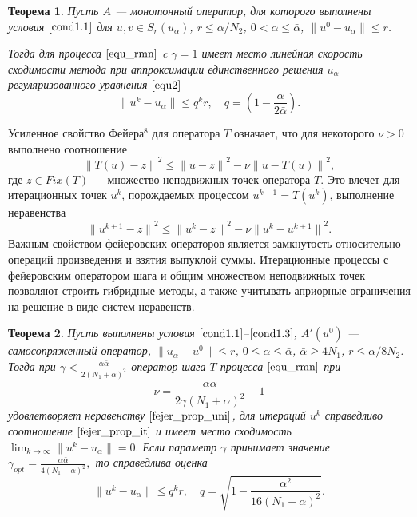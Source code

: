 \documentclass[%
autoref,     %
href,        %
facsimile,   %
colorlinks,  %
]{disser}
\newtheorem{theorem}{Теорема}
\begin{document}
\begin{theorem}\label{teo2.1} Пусть $A$ --- монотонный оператор, для которого выполнены условия $\eqref{cond1.1}$ для $u, v \in S_r(u_\alpha)$, $r\leqslant \alpha/N_2$, $0<\alpha \leqslant \bar\alpha$, $\|u^0-u_\alpha\| \leqslant r$. 
	
	Тогда для процесса $\eqref{equ_rmn}$ c $\gamma=1$ имеет место линейная скорость сходимости метода при аппроксимации единственного решения $u_\alpha$ регуляризованного уравнения $\eqref{equ2}$
	\begin{equation}\label{nwt_conv}
	\| u^k-u_\alpha \| \leqslant q^kr, \quad q=(1-\frac{\alpha}{2\bar\alpha}).
	\end{equation}
\end{theorem}

Усиленное свойство Фейера$^8$ для оператора $T$ означает, что для некоторого $\nu>0$ выполнено соотношение
\begin{equation}\label{fejer_prop_uni}
{\|T(u)-z\|}^2\leqslant{\|u-z\|}^2-\nu{\|u-T(u)\|}^2,
\end{equation}
где $z\in Fix(T)$ --- множество неподвижных точек оператора $T$. Это влечет для итерационных точек $u^k$, порождаемых процессом $u^{k+1}=T(u^k)$, выполнение неравенства
\begin{equation}\label{fejer_prop_it}
{\|u^{k+1}-z\|}^2\leqslant{\|u^k-z\|}^2-\nu{\|u^k-u^{k+1}\|}^2.
\end{equation}
{\scriptsize
\let\thefootnote\relax\let\thefootnote\relax{}}
Важным свойством фейеровских операторов является замкнутость относительно операций произведения и взятия выпуклой суммы. Итерационные процессы с фейеровским оператором шага и общим множеством неподвижных точек позволяют строить гибридные методы, а также учитывать априорные ограничения на решение в виде систем неравенств.

\begin{theorem} \label{teo2.3}
	Пусть выполнены условия $\eqref{cond1.1}$--$\eqref{cond1.3}$, $A'(u^0)$ --- самосопряженный оператор, $\|u_\alpha-u^0\|\leqslant r$, 
$0\leqslant\alpha\leqslant\bar\alpha$, $\bar\alpha\geqslant 4N_1$, $r\leqslant\alpha/8N_2$. Тогда при
	$\gamma<\frac{\alpha\bar\alpha}{2(N_1+\alpha)^2}$
	оператор шага $T$ процесса $\eqref{equ_rmn}$ при
	$$\nu=\frac{\alpha\bar\alpha}{2\gamma(N_1+\alpha)^2}-1$$
	удовлетворяет неравенству $\eqref{fejer_prop_uni}$, для итераций $u^k$ справедливо соотношение $\eqref{fejer_prop_it}$ и имеет место сходимость
	$\lim_{k\to\infty}\|u^k-u_\alpha\|=0.$
	Если параметр $\gamma$ принимает значение ${\gamma}_{opt}=\frac{\alpha\bar\alpha}{4(N_1+\alpha)^2},$ то справедлива оценка $$\|u^k-u_\alpha\|\leqslant q^k r, \quad q=\sqrt{1-\frac{{\alpha}^2}  {16(N_1+\alpha)^2}}.$$
\end{theorem}
\end{document}
